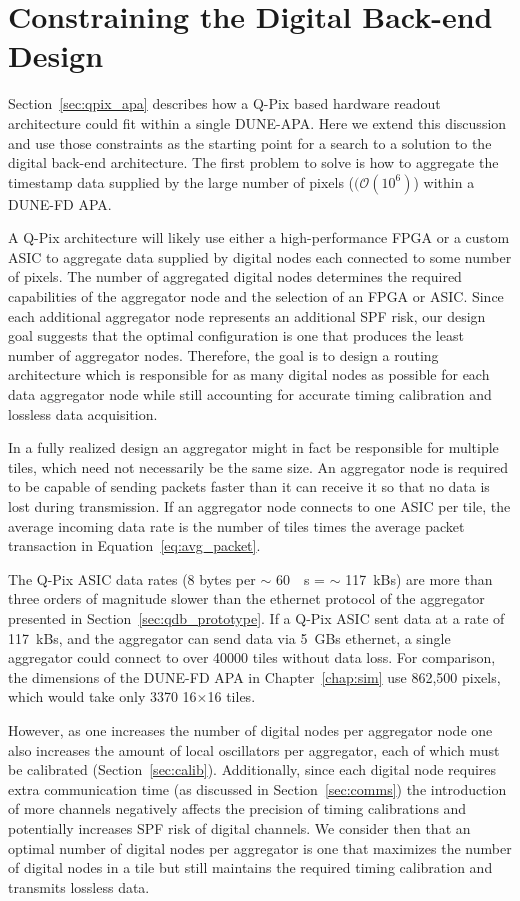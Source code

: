 \section{Constraining the Digital Back-end Design}\label{sec:digital_constraints}
Section~\ref{sec:qpix_apa} describes how a Q-Pix based hardware readout architecture could fit within a single DUNE-APA.
Here we extend this discussion and use those constraints as the starting point for a search to a solution to the digital back-end architecture.
The first problem to solve is how to aggregate the timestamp data supplied by the large number of pixels ($(\mathcal{O}(10^{6})$) within a DUNE-FD APA.

A Q-Pix architecture will likely use either a high-performance FPGA or a custom ASIC to aggregate data supplied by digital nodes each connected to some number of pixels.
The number of aggregated digital nodes determines the required capabilities of the aggregator node and the selection of an FPGA or ASIC.
Since each additional aggregator node represents an additional SPF risk, our design goal suggests that the optimal configuration is one that produces the least number of aggregator nodes.
Therefore, the goal is to design a routing architecture which is responsible for as many digital nodes as possible for each data aggregator node while still accounting for accurate timing calibration and lossless data acquisition.

In a fully realized design an aggregator might in fact be responsible for multiple tiles, which need not necessarily be the same size.
An aggregator node is required to be capable of sending packets faster than it can receive it so that no data is lost during transmission.
If an aggregator node connects to one ASIC per tile, the average incoming data rate is the number of tiles times the average packet transaction in Equation~\ref{eq:avg_packet}.

The Q-Pix ASIC data rates (8 bytes per $\sim$ 60~\unit{\mu s} = $\sim$ 117~\unit{kBs}) are more than three orders of magnitude slower than the ethernet protocol of the aggregator presented in Section~\ref{sec:qdb_prototype}.
If a Q-Pix ASIC sent data at a rate of 117~\unit{kBs}, and the aggregator can send data via 5~\unit{GBs} ethernet, a single aggregator could connect to over 40000 tiles without data loss.
For comparison, the dimensions of the DUNE-FD APA in Chapter~\ref{chap:sim} use 862,500 pixels, which would take only 3370 16$\times$16 tiles.

However, as one increases the number of digital nodes per aggregator node one also increases the amount of local oscillators per aggregator, each of which must be calibrated (Section~\ref{sec:calib}).
Additionally, since each digital node requires extra communication time (as discussed in Section~\ref{sec:comms}) the introduction of more channels negatively affects the precision of timing calibrations and potentially increases SPF risk of digital channels.
We consider then that an optimal number of digital nodes per aggregator is one that maximizes the number of digital nodes in a tile but still maintains the required timing calibration and transmits lossless data.

